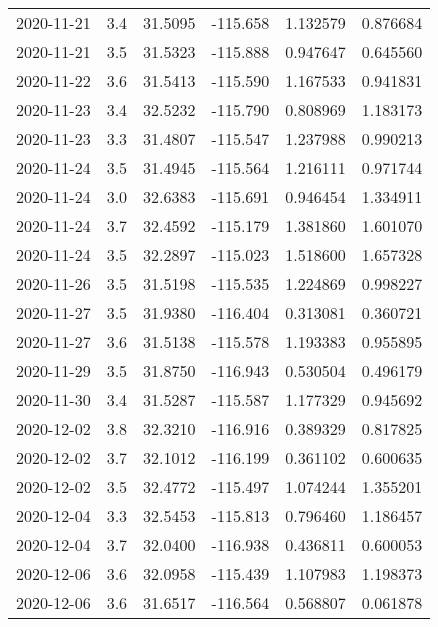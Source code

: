 \begin{tabular}{lrrrrr}
2020-11-21 &       3.4 &  31.5095 &  -115.658 &         1.132579 &         0.876684 \\
2020-11-21 &       3.5 &  31.5323 &  -115.888 &         0.947647 &         0.645560 \\
2020-11-22 &       3.6 &  31.5413 &  -115.590 &         1.167533 &         0.941831 \\
2020-11-23 &       3.4 &  32.5232 &  -115.790 &         0.808969 &         1.183173 \\
2020-11-23 &       3.3 &  31.4807 &  -115.547 &         1.237988 &         0.990213 \\
2020-11-24 &       3.5 &  31.4945 &  -115.564 &         1.216111 &         0.971744 \\
2020-11-24 &       3.0 &  32.6383 &  -115.691 &         0.946454 &         1.334911 \\
2020-11-24 &       3.7 &  32.4592 &  -115.179 &         1.381860 &         1.601070 \\
2020-11-24 &       3.5 &  32.2897 &  -115.023 &         1.518600 &         1.657328 \\
2020-11-26 &       3.5 &  31.5198 &  -115.535 &         1.224869 &         0.998227 \\
2020-11-27 &       3.5 &  31.9380 &  -116.404 &         0.313081 &         0.360721 \\
2020-11-27 &       3.6 &  31.5138 &  -115.578 &         1.193383 &         0.955895 \\
2020-11-29 &       3.5 &  31.8750 &  -116.943 &         0.530504 &         0.496179 \\
2020-11-30 &       3.4 &  31.5287 &  -115.587 &         1.177329 &         0.945692 \\
2020-12-02 &       3.8 &  32.3210 &  -116.916 &         0.389329 &         0.817825 \\
2020-12-02 &       3.7 &  32.1012 &  -116.199 &         0.361102 &         0.600635 \\
2020-12-02 &       3.5 &  32.4772 &  -115.497 &         1.074244 &         1.355201 \\
2020-12-04 &       3.3 &  32.5453 &  -115.813 &         0.796460 &         1.186457 \\
2020-12-04 &       3.7 &  32.0400 &  -116.938 &         0.436811 &         0.600053 \\
2020-12-06 &       3.6 &  32.0958 &  -115.439 &         1.107983 &         1.198373 \\
2020-12-06 &       3.6 &  31.6517 &  -116.564 &         0.568807 &         0.061878 \\

\end{tabular}
